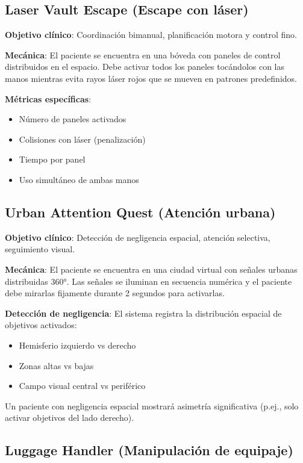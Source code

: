 \subsection{Laser Vault Escape (Escape con láser)}

\textbf{Objetivo clínico}: Coordinación bimanual, planificación motora y control fino.

\textbf{Mecánica}: El paciente se encuentra en una bóveda con paneles de control distribuidos en el espacio. Debe activar todos los paneles tocándolos con las manos mientras evita rayos láser rojos que se mueven en patrones predefinidos.

\textbf{Métricas específicas}:
\begin{itemize}
    \item Número de paneles activados
    \item Colisiones con láser (penalización)
    \item Tiempo por panel
    \item Uso simultáneo de ambas manos
\end{itemize}

\subsection{Urban Attention Quest (Atención urbana)}

\textbf{Objetivo clínico}: Detección de negligencia espacial, atención selectiva, seguimiento visual.

\textbf{Mecánica}: El paciente se encuentra en una ciudad virtual con señales urbanas distribuidas 360°. Las señales se iluminan en secuencia numérica y el paciente debe mirarlas fijamente durante 2 segundos para activarlas.

\textbf{Detección de negligencia}: El sistema registra la distribución espacial de objetivos activados:
\begin{itemize}
    \item Hemisferio izquierdo vs derecho
    \item Zonas altas vs bajas
    \item Campo visual central vs periférico
\end{itemize}

Un paciente con negligencia espacial mostrará asimetría significativa (p.ej., solo activar objetivos del lado derecho).

\subsection{Luggage Handler (Manipulación de equipaje)}

